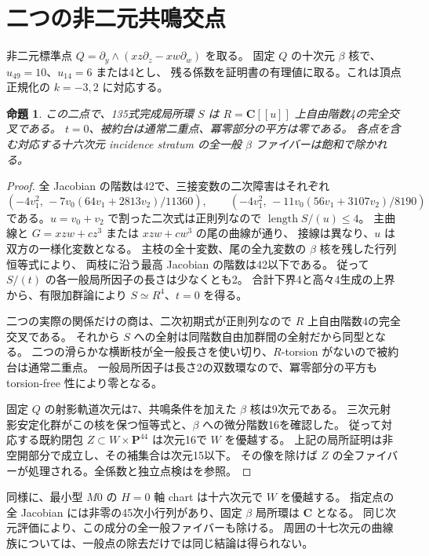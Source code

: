 \documentclass[11pt,a4paper]{ltjsarticle}
\newcommand{\CC}{\mathbf C}
\newcommand{\PP}{\mathbf P}
\newtheorem{proposition}[theorem]{命題}
\theoremstyle{remark}
\begin{document}
\section{二つの非二元共鳴交点}
非二元標準点 $Q=\partial_y\wedge(xz\partial_z-xw\partial_w)$ を取る。
固定 $Q$ の十次元 $\beta$ 核で、$u_{49}=10$、$u_{14}=6$ または4とし、
残る係数を証明書の有理値に取る。これは頂点正規化の $k=-3,2$ に対応する。
\begin{proposition}\label{prop:nodes-v35}
この二点で、135式完成局所環 $S$ は $R=\CC[[u]]$ 上自由階数4の完全交叉である。
$t=0$、被約台は通常二重点、冪零部分の平方は零である。
各点を含む対応する十六次元 incidence stratum の全一般 $\beta$ ファイバーは飽和で除かれる。
\end{proposition}
\begin{proof}
全 Jacobian の階数は42で、三接変数の二次障害はそれぞれ
\[
 (-4v_1^2,\,-7v_0(64v_1+2813v_2)/11360),\qquad
 (-4v_1^2,\,-11v_0(56v_1+3107v_2)/8190)
\]
である。$u=v_0+v_2$ で割った二次式は正則列なので $\operatorname{length}S/(u)\le4$。
主曲線と $G=xzw+c z^3$ または $xzw+c w^3$ の尾の曲線が通り、
接線は異なり、$u$ は双方の一様化変数となる。
主枝の全十変数、尾の全九変数の $\beta$ 核を残した行列恒等式により、
両枝に沿う最高 Jacobian の階数は42以下である。
従って $S/(t)$ の各一般局所因子の長さは少なくとも2。
合計下界4と高々4生成の上界から、有限加群論により $S\simeq R^4$、$t=0$ を得る。

二つの実際の関係だけの商は、二次初期式が正則列なので $R$ 上自由階数4の完全交叉である。
それから $S$ への全射は同階数自由加群間の全射だから同型となる。
二つの滑らかな横断枝が全一般長さを使い切り、$R$-torsion がないので被約台は通常二重点。
一般局所因子は長さ2の双数環なので、冪零部分の平方も torsion-free 性により零となる。

固定 $Q$ の射影軌道次元は7、共鳴条件を加えた $\beta$ 核は9次元である。
三次元射影安定化群がこの核を保つ恒等式と、$\beta$ への微分階数16を確認した。
従って対応する既約閉包 $Z\subset W\times\PP^{44}$ は次元16で $W$ を優越する。
上記の局所証明は非空開部分で成立し、その補集合は次元15以下。
その像を除けば $Z$ の全ファイバーが処理される。全係数と独立点検は\cite{nodes-v35}を参照。
\end{proof}
同様に、最小型 $M0$ の $H=0$ 軸 chart は十六次元で $W$ を優越する。
指定点の全 Jacobian には非零の45次小行列があり、固定 $\beta$ 局所環は $\CC$ となる。
同じ次元評価により、この成分の全一般ファイバーも除ける\cite{axis-v35}。
周囲の十七次元の曲線族については、一般点の除去だけでは同じ結論は得られない。
\end{document}
